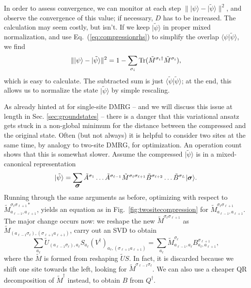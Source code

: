\documentclass[a4paper,10pt,oneside,onecolumn,1p,times]{elsarticle}
\newcommand{\tr}{{\rm Tr }}
\newcommand{\ket}[1]{\mbox{$| #1  \rangle$}}
\newcommand{\braket}[2]{\mbox{$\langle #1  | #2 \rangle$}} 	%
\newcommand{\fat}[1]{\mbox{\boldmath$#1$\unboldmath}}	%
\begin{document}
In order to assess convergence, we can monitor at each step $\| \ket{\psi} - \ket{\tilde{\psi}} \|^2$, and observe the convergence of this value; if necessary, $D$ has to be increased. The calculation may seem costly, but isn't. If we keep $\ket{\tilde{\psi}}$ in proper mixed normalization, and use Eq.~(\ref{eq:compressionrhs}) to simplify the overlap $\braket{\psi}{\tilde{\psi}}$, we find
\begin{equation}
\| \ket{\psi} - \ket{\tilde{\psi}} \|^2 = 1 - \sum_{\sigma_i} \tr (\tilde{M}^{\sigma_i\dagger}\tilde{M}^{\sigma_i}) , 
\end{equation}
which is easy to calculate. The subtracted sum is just $\braket{\tilde{\psi}}{\tilde{\psi}}$; at the end, this allows us to normalize the state $\ket{\tilde{\psi}}$ by simple rescaling. 

As already hinted at for single-site DMRG -- and we will discuss this issue at length in Sec. \ref{sec:groundstates} -- there is a danger that this variational ansatz gets stuck in a non-global minimum for the distance between the compressed and the original state. Often (but not always) it is helpful to consider two sites at the same time, by analogy to two-site DMRG, for optimization. An operation count shows that this is somewhat slower. Assume the compressed $\ket{\tilde{\psi}}$ is in a mixed-canonical representation
\begin{equation}
\ket{\tilde{\psi}} = \sum_{{\fat \sigma}} \tilde{A}^{\sigma_1} \ldots \tilde{A}^{\sigma_{\ell-1}} \tilde{M}^{\sigma_{\ell}\sigma_{\ell+1}} \tilde{B}^{\sigma_{\ell+2}} \ldots \tilde{B}^{\sigma_L}  \ket{{\fat \sigma}}.
\end{equation}
Running through the same arguments as before, optimizing with respect to $\tilde{M}^{\sigma_{\ell}\sigma_{\ell+1}*}_{a_{\ell-1},a_{\ell+1}}$, yields an equation as in Fig.~\ref{fig:twositecompression} for $\tilde{M}^{\sigma_{\ell}\sigma_{\ell+1}}_{a_{\ell-1},a_{\ell+1}}$. The major change occurs now: we reshape the new $\tilde{M}^{\sigma_{\ell}\sigma_{\ell+1}}$ as $\tilde{M}_{(a_{\ell-1}\sigma_{\ell}),(\sigma_{\ell+1}a_{\ell+1})}$, carry out an SVD to obtain 
\begin{equation}
\sum_{a_\ell} \tilde{U}_{(a_{\ell-1}\sigma_\ell), a_\ell} S_{a_\ell} (V^\dagger)_{a_\ell, (\sigma_{\ell+1}a_{\ell+1})} = \sum_{a_\ell} \tilde{M}^{\sigma_\ell}_{a_{\ell-1}, a_\ell} B^{\sigma_{\ell+1}}_{a_\ell, a_{\ell+1}} ,
\end{equation}
where the $\tilde{M}$ is formed from reshaping $\tilde{U} S$. In fact, it is discarded because we shift one site towards the left, looking for $\tilde{M}^{\sigma_{\ell-1}\sigma_{\ell}}$. We can also use a cheaper QR decomposition of $\tilde{M}^\dagger$ instead, to obtain $B$ from $Q^\dagger$.
\end{document}
